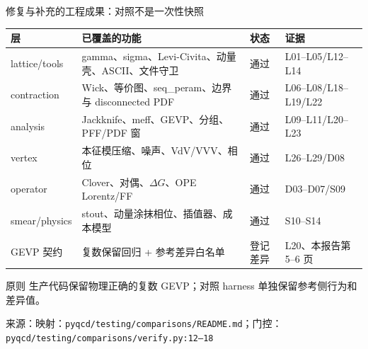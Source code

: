 \documentclass[UTF8,aspectratio=169,11pt]{ctexbeamer}
\newcommand{\source}[1]{\vspace{0.05em}\par{\raggedright\scriptsize\color{muted}来源：#1\par}}
\newcommand{\pass}{\textcolor{evidence}{通过}}
\newcommand{\diffmark}{\textcolor{warning}{登记差异}}
\begin{document}
\begin{frame}[t]{修复与补充的工程成果：对照不是一次性快照}
  \footnotesize
  \setlength{\tabcolsep}{2pt}
  \renewcommand{\arraystretch}{0.90}
  \begin{tabularx}{0.96\textwidth}{@{}
    >{\raggedright\arraybackslash}p{}
    >{\raggedright\arraybackslash}p{}
    >{\raggedright\arraybackslash}p{}
    Y@{}}
    \toprule
    层 & 已覆盖的功能 & 状态 & 证据\\
    \midrule
    lattice/tools & gamma、sigma、Levi-Civita、动量壳、ASCII、文件守卫 & \pass & L01--L05/L12--L14\\
    contraction & Wick、等价图、seq\_peram、边界与 disconnected PDF & \pass & L06--L08/L18--L19/L22\\
    analysis & Jackknife、meff、GEVP、分组、PFF/PDF 窗 & \pass & L09--L11/L20--L23\\
    vertex & 本征模压缩、噪声、VdV/VVV、相位 & \pass & L26--L29/D08\\
    operator & Clover、对偶、$\Delta G$、OPE Lorentz/FF & \pass & D03--D07/S09\\
    smear/physics & stout、动量涂抹相位、插值器、成本模型 & \pass & S10--S14\\
    GEVP 契约 & 复数保留回归 + 参考差异白名单 & \diffmark & L20、本报告第 5--6 页\\
    \bottomrule
  \end{tabularx}
  \begin{block}{原则}
    生产代码保留物理正确的复数 GEVP；对照 harness 单独保留参考侧行为和差异值。
  \end{block}
  \source{映射：\texttt{pyqcd/testing/comparisons/README.md}；门控：\texttt{pyqcd/testing/comparisons/verify.py:12--18}}
\end{frame}
\end{document}
